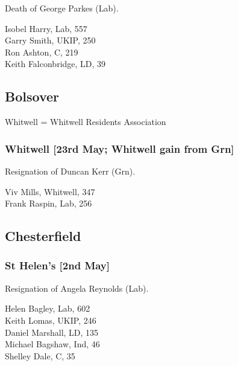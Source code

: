 \documentclass[a4paper,openany,10pt]{book}
\begin{document}

Death of George Parkes (Lab).



Isobel Harry, Lab, 557\\
Garry Smith, UKIP, 250\\
Ron Ashton, C, 219\\
Keith Falconbridge, LD, 39\\


\subsection*{Bolsover}

Whitwell = Whitwell Residents Association

\subsubsection*{Whitwell \hspace*{\fill}\nolinebreak[1]%
\enspace\hspace*{\fill}
[23rd May; Whitwell gain from Grn]}


Resignation of Duncan Kerr (Grn).



Viv Mills, Whitwell, 347\\
Frank Raspin, Lab, 256\\


\subsection*{Chesterfield}

\subsubsection*{St Helen's \hspace*{\fill}\nolinebreak[1]%
\enspace\hspace*{\fill}
[2nd May]}


Resignation of Angela Reynolds (Lab).



Helen Bagley, Lab, 602\\
Keith Lomas, UKIP, 246\\
Daniel Marshall, LD, 135\\
Michael Bagshaw, Ind, 46\\
Shelley Dale, C, 35\\
\end{document}

